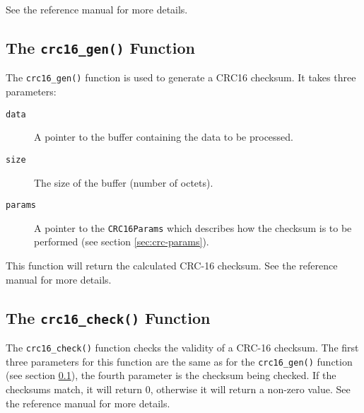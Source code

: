 \documentclass{article}
\begin{document}
See the reference manual for more details.

\subsection{The \texttt{crc16\_gen()} Function}
\label{sec:crc-gen}
The \texttt{crc16\_gen()} function is used to generate a CRC16
checksum.  It takes three parameters:
\begin{description}
\item[\texttt{data}]A pointer to the buffer containing the data to be
  processed.
\item[\texttt{size}]The size of the buffer (number of octets).
\item[\texttt{params}]A pointer to the \texttt{CRC16Params} which
  describes how the checksum is to be performed (see section
  \ref{sec:crc-params}).
\end{description}

This function will return the calculated CRC-16 checksum.  See the
reference manual for more details.

\subsection{The \texttt{crc16\_check()} Function}
The \texttt{crc16\_check()} function checks the validity of a CRC-16
checksum.  The first three parameters for this function are the same
as for the \texttt{crc16\_gen()} function (see section
\ref{sec:crc-gen}), the fourth parameter is the checksum being
checked.  If the checksums match, it will return 0, otherwise it will
return a non-zero value.  See the reference manual for more details.
\end{document}

